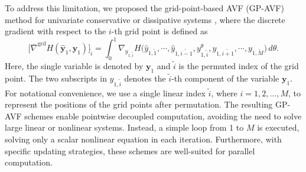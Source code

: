 \documentclass[fleqn,11pt]{elsarticle}
\numberwithin{equation}{section}
\begin{document}
To address this limitation, we proposed the grid-point-based AVF (GP-AVF) method for univariate conservative or dissipative systems \cite{cai_cmame}, where the discrete gradient with respect to the $i$-th grid point is defined as
\begin{equation}\label{grd-dg}
	\Big[\overline{\nabla}^{\text{grd}} H(\widehat{\bm{y}}_1, \bm{y}_1)\Big]_{\widetilde{i}} = \int_0^1 \nabla_{y_{1,\widetilde{i}}} H\big( \widehat{y}_{1,\widetilde{1}}, \cdots, \widehat{y}_{1,\widetilde{i-1}},  y_{1,\widetilde{i}}^\theta, y_{1,\widetilde{i+1}}, \cdots, y_{1,\widetilde{M}} \big) \, d\theta.
\end{equation}
Here, the single variable is denoted by $\bm{y}_1$ and $\widetilde{i}$ is the permuted index of the grid point. The two subscripts in $y_{1,\widetilde{i}}$ denotes the $\widetilde{i}$-th component of the variable $\bm{y}_1$. For notational convenience, we use a single linear index $\widetilde{i}$, where ${i} = {1}, {2}, \ldots, {M}$, to represent the positions of the grid points after permutation. The resulting GP-AVF schemes enable pointwise decoupled computation, avoiding the need to solve large linear or nonlinear systems. Instead, a simple loop from 1 to $M$ is executed, solving only a scalar nonlinear equation in each iteration. Furthermore, with specific updating strategies, these schemes are well-suited for parallel computation.
\end{document}
